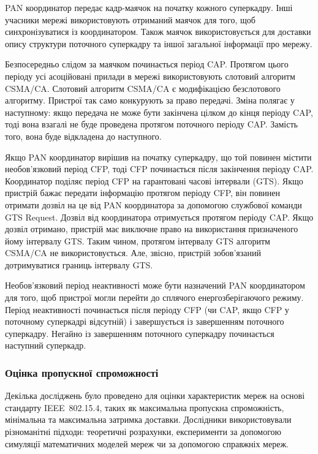 \documentclass[a4paper,ukrainian,utf8,nocolumnsxix,floatsection,equationsection]{eskdtext}
\renewcommand\paragraph{\subsubsection}
\newcommand{\iee}[0]{IEEE~802.15.4\xspace}
\newcommand{\csma}[0]{CSMA/CA\xspace}
\begin{document}
PAN координатор передає кадр-маячок на початку кожного суперкадру. Інші учасники мережі використовують отриманий маячок для того, щоб синхронізуватися із координатором. Також маячок використовується для доставки опису структури поточного суперкадру та іншої загальної інформації про мережу. 

Безпосередньо слідом за маячком починається період CAP. Протягом цього періоду усі асоційовані прилади в мережі використовують слотовий алгоритм \csma. Слотовий алгоритм \csma є модифікацією безслотового алгоритму. Пристрої так само конкурують за право передачі. Зміна полягає у наступному: якщо передача не може бути закінчена цілком до кінця періоду CAP, тоді вона взагалі не буде проведена протягом поточного періоду CAP. Замість того, вона буде відкладена до наступного. %

Якщо PAN координатор вирішив на початку суперкадру, що  той повинен містити необов’язковий період CFP, тоді CFP починається після закінчення періоду CAP. Координатор поділяє період CFP на гарантовані часові інтервали (GTS). Якщо пристрій бажає передати інформацію протягом періоду CFP, він повинен отримати дозвіл на це від PAN координатора за допомогою службової команди GTS Request. Дозвіл від координатора отримується протягом періоду CAP. Якщо дозвіл отримано, пристрій має виключне право на використання призначеного йому інтервалу GTS. Таким чином, протягом інтервалу GTS алгоритм \csma не використовується. Але, звісно, пристрій зобов’язаний дотримуватися границь інтервалу GTS. 

Необов’язковий період неактивності може бути назначений PAN координатором для того, щоб пристрої могли перейти до сплячого енергозберігаючого режиму. Період неактивності починається після періоду CFP (чи CAP, якщо CFP у поточному суперкадрі відсутній) і завершується із завершенням поточного суперкадру.
Негайно із завершенням поточного суперкадру починається наступний суперкадр. 

\paragraph{Оцінка пропускної спроможності}
\label{par:throughput:evaluation}

Декілька досліджень було проведено для оцінки характеристик мереж на основі стандарту \iee, таких як максимальна пропускна спроможність, мінімальна та максимальна затримка доставки. Дослідники використовували різноманітні підходи: теоретичні розрахунки, експерименти за допомогою симуляції математичних моделей мереж чи за допомогою справжніх мереж.
\end{document}
